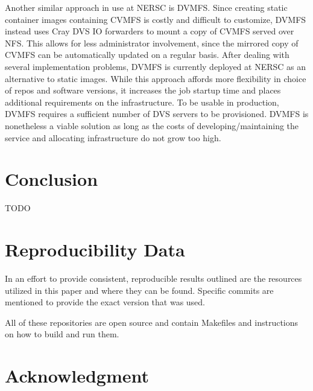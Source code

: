 \documentclass[sigconf]{acmart}
\begin{document}
Another similar approach in use at NERSC is DVMFS.
Since creating static container images containing CVMFS is costly and difficult to customize,
DVMFS instead uses Cray DVS IO forwarders to mount a copy of CVMFS served over NFS.
This allows for less administrator involvement,
since the mirrored copy of CVMFS can be automatically updated on a regular basis.
After dealing with several implementation problems,
DVMFS is currently deployed at NERSC as an alternative to static images.
While this approach affords more flexibility in choice of repos and software versions,
it increases the job startup time and places additional requirements on the infrastructure.
To be usable in production, DVMFS requires a sufficient number of DVS servers to be provisioned.
DVMFS is nonetheless a viable solution as long as the costs of developing/maintaining the service and allocating infrastructure do not grow too high.
\fi

\section{Conclusion}
TODO

\section{Reproducibility Data}

In an effort to provide consistent, reproducible results outlined are the
resources utilized in this paper and where they can be found.
Specific commits are mentioned to provide the exact version that was used.


All of these repositories are open source and contain Makefiles
and instructions on how to build and run them.

\section*{Acknowledgment}




\end{document}
